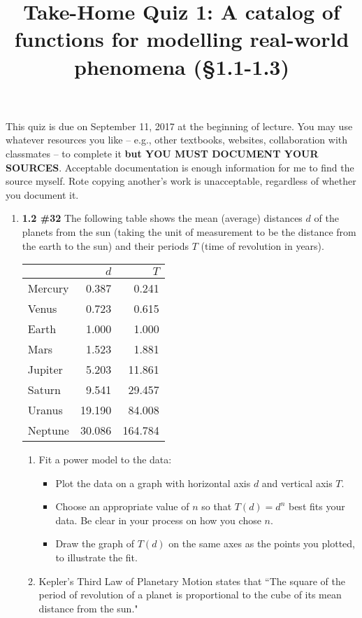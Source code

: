 \documentclass[%
]{article}
\title{\vspace{-3.5pc} 
	\flushleft \bf \Large Take-Home Quiz 1: %
	A catalog of functions for modelling real-world phenomena (\S 1.1-1.3)}
\date{}
\begin{document}
\maketitle

\vspace{-3pc}
 This quiz is due on September 11, 2017 at the beginning of lecture.  You may use whatever resources you like -- e.g., other textbooks, websites, collaboration with classmates -- to complete it \textbf{but YOU MUST DOCUMENT YOUR SOURCES}.  Acceptable documentation is enough information for me to find the source myself.  Rote copying another's work is unacceptable, regardless of whether you document it.  

\noindent\hrulefill

\begin{enumerate}
\item {\bf 1.2 \#32} The following table shows the mean (average) distances $d$ of the planets from the sun (taking the unit of measurement to be the distance from the earth to the sun) and their periods $T$ (time of revolution in years).

\begin{center}
\begin{tabular}{l|rr}
 & {$d$} & {$T$} \\
\hline
Mercury & 0.387 & 0.241 \\
Venus & 0.723 & 0.615 \\
Earth & 1.000 & 1.000 \\
Mars & 1.523 & 1.881 \\
Jupiter & 5.203 & 11.861 \\
Saturn & 9.541 & 29.457 \\
Uranus & 19.190 & 84.008 \\
Neptune & 30.086 & 164.784
\end{tabular}
\end{center}
	
	\begin{enumerate}
	\item Fit a power model to the data:  
		\begin{itemize}
		\item Plot the data on a graph with horizontal axis $d$ and vertical axis $T$.  
		\item Choose an appropriate value of $n$ so that $T(d)=d^n$ best fits your data.  Be clear in your process on how you chose $n$.
		\item Draw the graph of $T(d)$ on the same axes as the points you plotted, to illustrate the fit. 
		\end{itemize}	
	\item Kepler's Third Law of Planetary Motion states that ``The square of the period of revolution of a planet is proportional to the cube of its mean distance from the sun."
	

\end{enumerate}
\end{enumerate}
\end{document}
